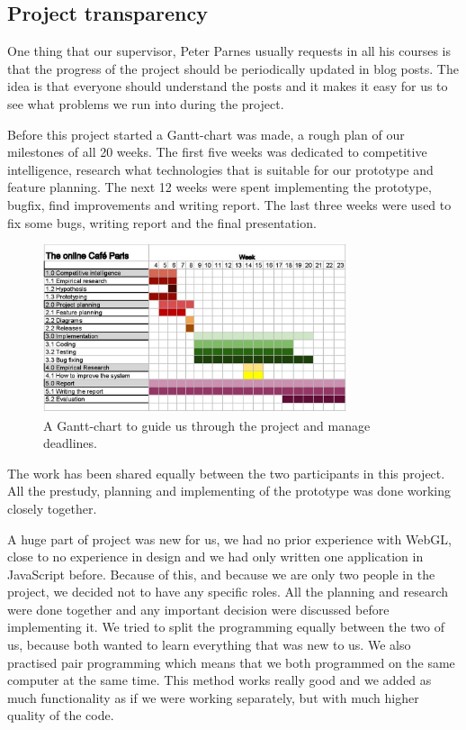 \documentclass[12pt, titlepage]{article}
\begin{document}
\subsection{Project transparency}
One thing that our supervisor, Peter Parnes usually requests in all his courses is that the progress of the project should be periodically updated in blog posts\cite{1}. The idea is that everyone should understand the posts and it makes it easy for us to see what problems we run into during the project.

Before this project started a Gantt-chart was made, a rough plan of our milestones of all 20 weeks. The first five weeks was dedicated to competitive intelligence, research what technologies that is suitable for our prototype and feature planning. The next 12 weeks were spent implementing the prototype, bugfix, find improvements and writing report. The last three weeks were used to fix some bugs, writing report and the final presentation.
\begin{figure}[H]
  \centering
	\includegraphics[width=0.8\textwidth,keepaspectratio]{grovplanering.jpg}
  \caption{A Gantt-chart to guide us through the project and manage deadlines.}
\end{figure}
The work has been shared equally between the two participants in this project. All the prestudy, planning and implementing of the prototype was done working closely together. 

A huge part of project was new for us, we had no prior experience with WebGL, close to no experience in design and we had only written one application in JavaScript before. Because of this, and because we are only two people in the project, we decided not to have any specific roles. All the planning and research were done together and any important decision were discussed before implementing it. We tried to split the programming equally between the two of us, because both wanted to learn everything that was new to us. We also practised pair programming which means that we both programmed on the same computer at the same time. This method works really good and we added as much functionality as if we were working separately, but with much higher quality of the code.
\end{document}

